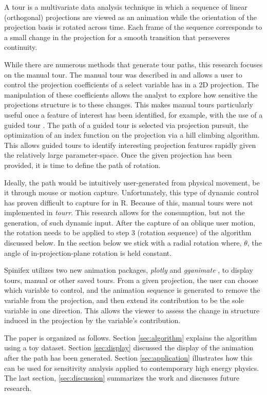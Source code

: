 \documentclass{monashthesis}
\theoremstyle{definition}
\theoremstyle{definition}
\theoremstyle{definition}
\theoremstyle{remark}
\begin{document}
A tour is a multivariate data analysis technique in which a sequence of
linear (orthogonal) projections are viewed as an animation while the
orientation of the projection basis is rotated across time. Each frame
of the sequence corresponds to a small change in the projection for a
smooth transition that perseveres continuity.

While there are numerous methods that generate tour paths, this research
focuses on the manual tour. The manual tour was described in
\textcite{cook_manual_1997} and allows a user to control the projection
coefficients of a select variable has in a 2D projection. The
manipulation of these coefficients allows the analyst to explore how
sensitive the projections structure is to these changes. This makes
manual tours particularly useful once a feature of interest has been
identified, for example, with the use of a guided tour
\autocite{cook_grand_1995}. The path of a guided tour is selected via
projection pursuit, the optimization of an index function on the
projection via a hill climbing algorithm. This allows guided tours to
identify interesting projection features rapidly given the relatively
large parameter-space. Once the given projection has been provided, it
is time to define the path of rotation.

Ideally, the path would be intuitively user-generated from physical
movement, be it through mouse or motion capture. Unfortunately, this
type of dynamic control has proven difficult to capture for in R.
Because of this, manual tours were not implemented in \emph{tourr}. This
research allows for the consumption, but not the generation, of such
dynamic input. After the capture of an oblique user motion, the rotation
needs to be applied to step 3 (rotation sequence) of the algorithm
discussed below. In the section below we stick with a radial rotation
where, \(\theta\), the angle of in-projection-plane rotation is held
constant.

Spinifex utilizes two new animation packages, \emph{plotly}
\autocite{sievert_plotly_2018} and \emph{gganimate}
\autocite{pedersen_gganimate:_2019}, to display tours, manual or other
saved tours. From a given projection, the user can choose which variable
to control, and the animation sequence is generated to remove the
variable from the projection, and then extend its contribution to be the
sole variable in one direction. This allows the viewer to assess the
change in structure induced in the projection by the variable's
contribution.

The paper is organized as follows. Section \ref{sec:algorithm} explains
the algorithm using a toy dataset. Section \ref{sec:display} discussed
the display of the animation after the path has been generated. Section
\ref{sec:application} illustrates how this can be used for sensitivity
analysis applied to contemporary high energy physics. The last section,
\ref{sec:discussion} summarizes the work and discusses future research.
\end{document}
